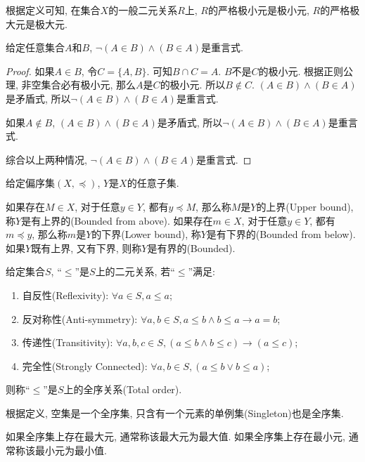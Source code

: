 根据定义可知, 在集合$X$的一般二元关系$R$上, $R$的严格极小元是极小元, $R$的严格极大元是极大元.

\begin{proposition}
	给定任意集合$A$和$B$, $\neg (A\in B)\wedge(B\in A)$是重言式.
\end{proposition}

\begin{proof}
	如果$A\in B$, 令$C=\{A,B\}$. 可知$B\cap C=A$. $B$不是$C$的极小元. 根据正则公理, 非空集合必有极小元, 那么$A$是$C$的极小元. 所以$B\notin C$. $(A\in B)\wedge(B\in A)$是矛盾式, 所以$\neg (A\in B)\wedge(B\in A)$是重言式.
	
	如果$A\notin B$, $(A\in B)\wedge(B\in A)$是矛盾式, 所以$\neg (A\in B)\wedge(B\in A)$是重言式.
	
	综合以上两种情况, $\neg (A\in B)\wedge(B\in A)$是重言式.
\end{proof}

\begin{definition}
	给定偏序集$(X, \preccurlyeq)$, $Y$是$X$的任意子集.
	
	如果存在$M\in X$, 对于任意$y\in Y$, 都有$y\preccurlyeq M$, 那么称$M$是$Y$的上界(Upper bound), 称$Y$是有上界的(Bounded from above).
	如果存在$m\in X$, 对于任意$y\in Y$, 都有$m\preccurlyeq y$, 那么称$m$是$Y$的下界(Lower bound), 称$Y$是有下界的(Bounded from below).
	如果$Y$既有上界, 又有下界, 则称$Y$是有界的(Bounded).
\end{definition}

\begin{definition}[全序关系]
	给定集合$S$, ``$\leq$''是$S$上的二元关系, 若``$\leq$''满足:
	\begin{enumerate}
		\item 自反性(Reflexivity): $\forall a\in S, a\leq a$;
		\item 反对称性(Anti-symmetry): $\forall a,b\in S, a\leq b\wedge b\leq a\rightarrow a=b$;
		\item 传递性(Transitivity): $\forall a,b,c\in S, (a\leq b\wedge b\leq c)\rightarrow (a\leq c)$;
		\item 完全性(Strongly Connected): $\forall a,b\in S, (a\leq b\vee b\leq a)$;
	\end{enumerate}
	则称``$\leq$''是$S$上的全序关系(Total order).
\end{definition}

根据定义, 空集是一个全序集, 只含有一个元素的单例集(Singleton)也是全序集.

如果全序集上存在最大元, 通常称该最大元为最大值. 如果全序集上存在最小元, 通常称该最小元为最小值.

